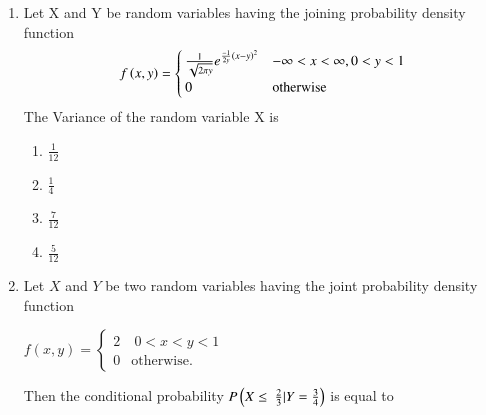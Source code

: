 \renewcommand{\theequation}{\theenumi}
\renewcommand{\thefigure}{\theenumi}
\renewcommand{\thetable}{\theenumi}
\begin{enumerate}[label=\thesection.\arabic*.,ref=\thesection.\theenumi]

\item Let X and Y be random variables having the joining probability density function
\begin{align}
f\left(x,y\right)=
\begin{cases}
\frac{1}{\sqrt{2\pi y}}e^{\frac{-1}{2y}\left(x-y\right)^2} &-\infty<x<\infty,0<y<1\\
0 &\text{otherwise}
\end{cases}
\end{align}
The Variance of the random variable X is\\
\begin{enumerate}[label=\alph*)]
\item $\frac{1}{12}$ \\
\item $\frac{1}{4}$ \\
\item $\frac{7}{12}$ \\
\item $\frac{5}{12}$ \\
\end{enumerate}
\solution



\item Let $X$ and $Y$ be two random variables having the joint probability density function

\begin{center}
$ 
f(x,y)=
\begin{cases}
2 &  \ 0<x<y<1 \\
0 & \text{otherwise}.
\end{cases}
$\\ 
\end{center}

Then the conditional probability $P \left(X \leq\ \frac{2}{3} | Y=\frac{3}{4}\right)$ is equal to \underline{\hspace{3cm}}

\begin{enumerate}
\end{enumerate}
\end{enumerate}
